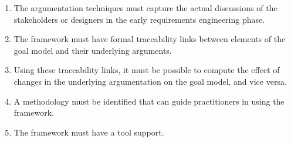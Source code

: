 \begin{enumerate}
\item 
The argumentation techniques must capture the actual discussions of the stakeholders or designers in the early requirements engineering phase.
\item 
The framework must have formal traceability links between elements of the goal model and their underlying arguments.
\item 
Using these traceability links, it must be possible to compute the effect of changes in the underlying argumentation on the goal model, and vice versa.
\item 
A methodology must be identified that can guide practitioners in using the framework.
\item 
The framework must have a tool support.
\end{enumerate}





